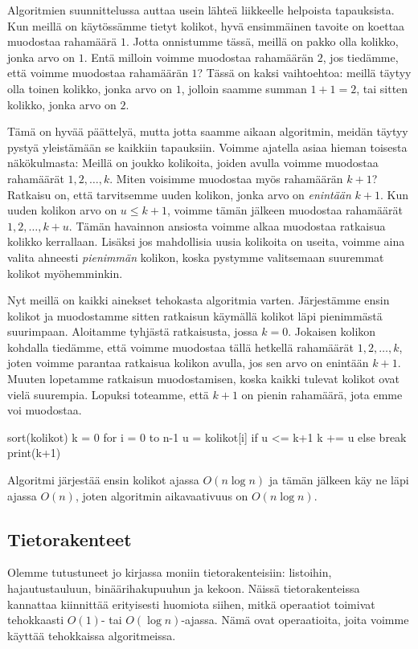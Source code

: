 Algoritmien suunnittelussa auttaa usein
lähteä liikkeelle helpoista tapauksista.
Kun meillä on käytössämme tietyt kolikot,
hyvä ensimmäinen tavoite on koettaa muodostaa rahamäärä $1$.
Jotta onnistumme tässä, meillä on pakko olla kolikko,
jonka arvo on $1$.
Entä milloin voimme muodostaa rahamäärän $2$,
jos tiedämme, että voimme muodostaa rahamäärän $1$?
Tässä on kaksi vaihtoehtoa: meillä täytyy olla
toinen kolikko, jonka arvo on $1$, jolloin saamme
summan $1+1=2$, tai sitten kolikko, jonka arvo on $2$.

Tämä on hyvää päättelyä, mutta jotta saamme aikaan algoritmin,
meidän täytyy pystyä yleistämään se kaikkiin tapauksiin.
Voimme ajatella asiaa hieman toisesta näkökulmasta:
Meillä on joukko kolikoita, joiden avulla voimme muodostaa
rahamäärät $1,2,\dots,k$.
Miten voisimme muodostaa myös rahamäärän $k+1$?
Ratkaisu on, että tarvitsemme uuden kolikon,
jonka arvo on \emph{enintään} $k+1$.
Kun uuden kolikon arvo on $u \le k+1$,
voimme tämän jälkeen muodostaa rahamäärät $1,2,\dots,k+u$.
Tämän havainnon ansiosta voimme alkaa muodostaa ratkaisua
kolikko kerrallaan.
Lisäksi jos mahdollisia uusia kolikoita on useita,
voimme aina valita ahneesti \emph{pienimmän} kolikon,
koska pystymme valitsemaan suuremmat kolikot myöhemminkin.

Nyt meillä on kaikki ainekset tehokasta algoritmia varten.
Järjes\-tämme ensin kolikot ja muodostamme sitten ratkaisun
käymällä kolikot läpi pienimmästä suurimpaan.
Aloitamme tyhjästä ratkaisusta, jossa $k=0$.
Jokaisen kolikon kohdalla tiedämme,
että voimme muodostaa tällä hetkellä rahamäärät $1,2,\dots,k$,
joten voimme parantaa ratkaisua kolikon avulla,
jos sen arvo on enintään $k+1$.
Muuten lopetamme ratkaisun muodostamisen,
koska kaikki tulevat kolikot ovat vielä suurempia.
Lopuksi toteamme, että $k+1$ on pienin rahamäärä,
jota emme voi muodostaa.

\begin{code}
sort(kolikot)
k = 0
for i = 0 to n-1
    u = kolikot[i]
    if u <= k+1
        k += u
    else
        break
print(k+1)
\end{code}

Algoritmi järjestää ensin kolikot ajassa $O(n \log n)$
ja tämän jälkeen käy ne läpi ajassa $O(n)$,
joten algoritmin aikavaativuus on $O(n \log n)$.

\subsection{Tietorakenteet}

Olemme tutustuneet jo kirjassa moniin tietorakenteisiin:
listoihin, hajautustauluun, binäärihakupuuhun ja kekoon.
Näissä tietorakenteissa kannattaa kiinnittää erityisesti huomiota siihen,
mitkä operaatiot toimivat tehokkaasti $O(1)$- tai $O(\log n)$-ajassa.
Nämä ovat operaatioita, joita voimme käyttää tehokkaissa algoritmeissa.

